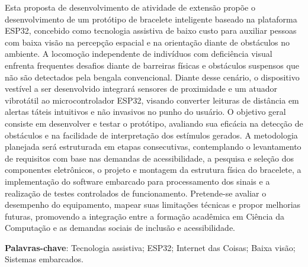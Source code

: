 
\setlength{\absparsep}{18pt} %
\begin{resumo}
Esta proposta de desenvolvimento de atividade de extensão propõe o desenvolvimento de um protótipo de bracelete inteligente baseado na plataforma ESP32, concebido como tecnologia assistiva de baixo custo para auxiliar pessoas com baixa visão na percepção espacial e na orientação diante de obstáculos no ambiente. A locomoção independente de indivíduos com deficiência visual enfrenta frequentes desafios diante de barreiras físicas e obstáculos suspensos que não são detectados pela bengala convencional. Diante desse cenário, o dispositivo vestível a ser desenvolvido integrará sensores de proximidade e um atuador vibrotátil ao microcontrolador ESP32, visando converter leituras de distância em alertas táteis intuitivos e não invasivos no punho do usuário. O objetivo geral consiste em desenvolver e testar o protótipo, avaliando sua eficácia na detecção de obstáculos e na facilidade de interpretação dos estímulos gerados. A metodologia planejada será estruturada em etapas consecutivas, contemplando o levantamento de requisitos com base nas demandas de acessibilidade, a pesquisa e seleção dos componentes eletrônicos, o projeto e montagem da estrutura física do bracelete, a implementação do software embarcado para processamento dos sinais e a realização de testes controlados de funcionamento. Pretende-se avaliar o desempenho do equipamento, mapear suas limitações técnicas e propor melhorias futuras, promovendo a integração entre a formação acadêmica em Ciência da Computação e as demandas sociais de inclusão e acessibilidade.
 
 \textbf{Palavras-chave}: Tecnologia assistiva; ESP32; Internet das Coisas; Baixa visão; Sistemas embarcados.
\end{resumo}

